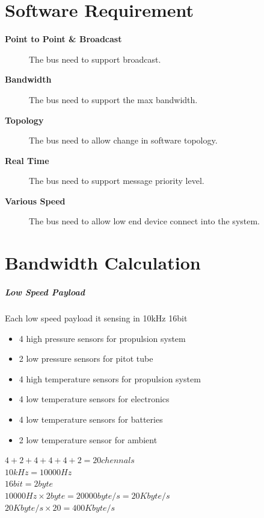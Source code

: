 \documentclass[12pt,article]{memoir}
\begin{document}
\section{Software Requirement}
\begin{description}
	\item[\textbf{Point to Point \& Broadcast}]The bus need to support broadcast.
	\item[\textbf{Bandwidth}]The bus need to support the max bandwidth.
	\item[\textbf{Topology}]The bus need to allow change in software topology.
	\item[\textbf{Real Time}]The bus need to support message priority level.
	\item[\textbf{Various Speed}]The bus need to allow low end device connect into the system.
\end{description}

\section{Bandwidth Calculation}

\subparagraph{Low Speed Payload}
Each low speed payload it sensing in 10kHz 16bit
\begin{itemize}
\item 4 high pressure sensors for propulsion system
\item 2 low pressure sensors for pitot tube
\item 4 high temperature sensors for propulsion system
\item 4 low temperature sensors for electronics
\item 4 low temperature sensors for batteries
\item 2 low temperature sensor for ambient
\end{itemize}
\begin{center}
$4+2+4+4+4+2=20 chennals$\\
$10kHz=10000Hz$\\
$16bit=2byte$\\
$10000Hz\times2byte=20000byte/s=20Kbyte/s$\\
$20Kbyte/s\times20=400Kbyte/s$
\end{center}
\end{document}
